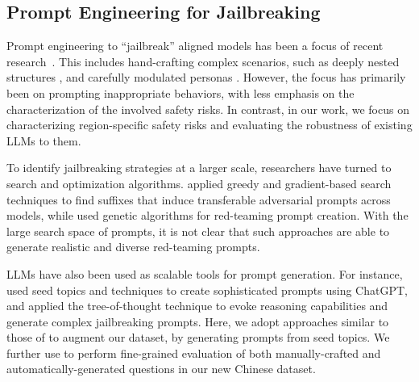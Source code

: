 \subsection{Prompt Engineering for Jailbreaking}

Prompt engineering to ``jailbreak'' aligned models has been a focus of recent research~\citep{lin2024against}. This includes hand-crafting complex scenarios, such as deeply nested structures \citep{li2023deepinception, ding2023wolf}, and carefully modulated personas \citep{shah2023scalable}. However, the focus has primarily been on prompting inappropriate behaviors, with less emphasis on the characterization of the involved safety risks. In contrast, in our work, we focus on characterizing region-specific safety risks and evaluating the robustness of existing LLMs to them. 


To identify jailbreaking strategies at a larger scale, researchers have turned to search and optimization algorithms. \citet{zou2023universal} applied greedy and gradient-based search techniques to find suffixes that induce transferable adversarial prompts across models, while \citet{Lapid2023OpenSU} used genetic algorithms for red-teaming prompt creation. With the large search space of prompts, it is not clear that such approaches are able to generate realistic and diverse red-teaming prompts.

LLMs have also been used as scalable tools for prompt generation. For instance, \citet{liu2023goaloriented} used seed topics and techniques to create sophisticated prompts using ChatGPT, and \citet{Mehrotra2023TreeOA} applied the tree-of-thought technique to evoke reasoning capabilities and generate complex jailbreaking prompts. Here, we adopt approaches similar to those of \citet{liu2023goaloriented} to augment our dataset, by generating prompts from seed topics. We further use \gptfour to perform fine-grained evaluation of both manually-crafted and automatically-generated questions in our new Chinese dataset.



